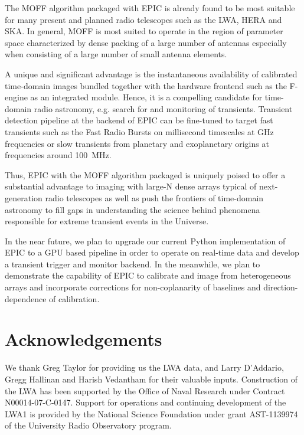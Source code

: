 \documentclass[a4paper,fleqn,usenatbib]{../mnras}
\begin{document}
The MOFF algorithm packaged with EPIC is already found to be most suitable 
for many present and planned radio telescopes such as the LWA, HERA and SKA. 
In general, MOFF is most suited to operate in the region of parameter space
characterized by dense packing of a large number of antennas especially when 
consisting of a large number of small antenna elements. 

A unique and significant advantage is the instantaneous availability of 
calibrated time-domain images bundled together with the hardware frontend 
such as the F-engine as an integrated module. Hence, it is a compelling 
candidate for time-domain radio astronomy, e.g. search for and monitoring of 
transients. Transient detection pipeline at the backend of EPIC can be 
fine-tuned to target fast transients such as the Fast Radio Bursts 
\citep[FRB;][]{tho13} on millisecond timescales at GHz frequencies or slow 
transients from planetary and exoplanetary origins at frequencies around 
100~MHz. 

Thus, EPIC with the MOFF algorithm packaged is uniquely poised to offer a
substantial advantage to imaging with large-N dense arrays typical of 
next-generation radio telescopes as well as push the frontiers of 
time-domain astronomy to fill gaps in understanding the science behind 
phenomena responsible for extreme transient events in the Universe.

In the near future, we plan to upgrade our current Python implementation 
of EPIC to a GPU based pipeline in order to operate on real-time data and 
develop a transient trigger and monitor backend. In the meanwhile, we plan 
to demonstrate the capability of EPIC to calibrate and image from heterogeneous 
arrays and incorporate corrections for non-coplanarity of baselines and 
direction-dependence of calibration. 

\section*{Acknowledgements}

We thank Greg Taylor for providing us the LWA data, and Larry D'Addario, 
Gregg Hallinan and Harish Vedantham for their valuable inputs. Construction of 
the LWA has been supported by the Office of Naval Research under Contract 
N00014-07-C-0147. Support for operations and continuing development of the LWA1 
is provided by the National Science Foundation under grant AST-1139974 of the 
University Radio Observatory program.

\end{document}
